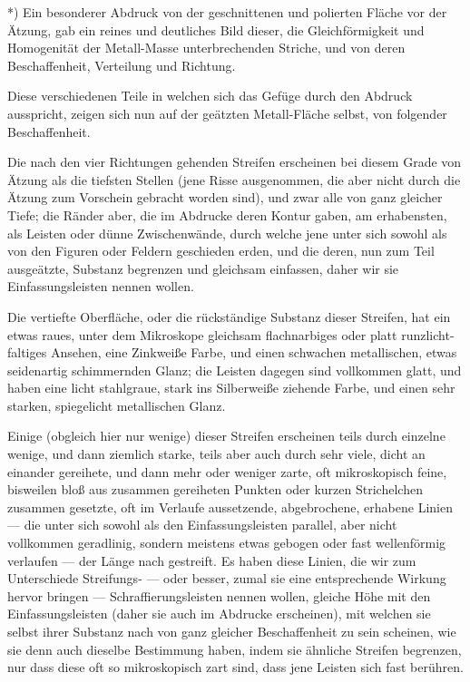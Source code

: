 \documentclass[a4paper, 11pt, oneside, german]{article}
\begin{document}
*) Ein besonderer Abdruck von der geschnittenen und polierten Fläche vor der Ätzung, gab ein reines und deutliches Bild dieser, die Gleichförmigkeit und Homogenität der Metall-Masse unterbrechenden Striche, und von deren Beschaffenheit, Verteilung und Richtung.

Diese verschiedenen Teile in welchen sich das Gefüge durch den Abdruck ausspricht, zeigen sich nun auf der geätzten Metall-Fläche selbst, von folgender Beschaffenheit.

Die nach den vier Richtungen gehenden Streifen erscheinen bei diesem Grade von Ätzung als die tiefsten Stellen (jene Risse ausgenommen, die aber nicht durch die Ätzung zum Vorschein gebracht worden sind), und zwar alle von ganz gleicher Tiefe; die Ränder aber, die im Abdrucke deren Kontur gaben, am erhabensten, als Leisten oder dünne Zwischenwände, durch welche jene unter sich sowohl als von den Figuren oder Feldern geschieden erden, und die deren, nun zum Teil ausgeätzte, Substanz begrenzen und gleichsam einfassen, daher wir sie Einfassungsleisten nennen wollen.

Die vertiefte Oberfläche, oder die rückständige Substanz dieser Streifen, hat ein etwas raues, unter dem Mikroskope gleichsam flachnarbiges oder platt runzlicht-faltiges Ansehen, eine Zinkweiße Farbe, und einen schwachen metallischen, etwas seidenartig schimmernden Glanz; die Leisten dagegen sind vollkommen glatt, und haben eine licht stahlgraue, stark ins Silberweiße ziehende Farbe, und einen sehr starken, spiegelicht metallischen Glanz.

Einige (obgleich hier nur wenige) dieser Streifen erscheinen teils durch einzelne wenige, und dann ziemlich starke, teils aber auch durch sehr viele, dicht an einander gereihete, und dann mehr oder weniger zarte, oft mikroskopisch feine, bisweilen bloß aus zusammen gereiheten Punkten oder kurzen Strichelchen zusammen gesetzte, oft im Verlaufe aussetzende, abgebrochene, erhabene Linien --- die unter sich sowohl als den Einfassungsleisten parallel, aber nicht vollkommen geradlinig, sondern meistens etwas gebogen oder fast wellenförmig verlaufen --- der Länge nach gestreift. Es haben diese Linien, die wir zum Unterschiede Streifungs- --- oder besser, zumal sie eine entsprechende Wirkung hervor bringen --- Schraffierungsleisten nennen wollen, gleiche Höhe mit den Einfassungsleisten (daher sie auch im Abdrucke erscheinen), mit welchen sie selbst ihrer Substanz nach von ganz gleicher Beschaffenheit zu sein scheinen, wie sie denn auch dieselbe Bestimmung haben, indem sie ähnliche Streifen begrenzen, nur dass diese oft so mikroskopisch zart sind, dass jene Leisten sich fast berühren.
\end{document}
